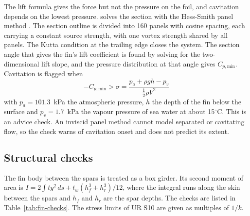 The lift formula gives the force but not the pressure on the foil, and
cavitation depends on the lowest pressure. \NEMO{} solves the section with the
Hess-Smith panel method \cite{hess1967}. The section outline is divided into
160 panels with cosine spacing, each carrying a constant source strength, with
one vortex strength shared by all panels. The Kutta condition at the trailing
edge closes the system. The section angle that gives the fin's lift
coefficient is found by solving for the two-dimensional lift slope, and the
pressure distribution at that angle gives $C_{p,\text{min}}$. Cavitation is
flagged when
\begin{equation}
-C_{p,\text{min}} > \sigma = \frac{p_a + \rho g h - p_v}{\tfrac{1}{2}\rho V^2}
\label{eq:cavitation}
\end{equation}
with $p_a = 101.3$~kPa the atmospheric pressure, $h$ the depth of the fin
below the surface and $p_v = 1.7$~kPa the vapour pressure of sea water at
about 15$^\circ$C. This is an advice check.
An inviscid panel method cannot model separated or cavitating flow, so the
check warns of cavitation onset and does not predict its extent.

\subsection{Structural checks}

The fin body between the spars is treated as a box girder. Its second moment
of area is $I = 2\int t y^2\, ds + t_w(h_f^3 + h_r^3)/12$, where the integral
runs along the skin between the spars and $h_f$ and $h_r$ are the spar depths.
The checks are listed in Table~\ref{tab:fin-checks}. The stress limits of UR
S10 are given as multiples of $1/k$.

